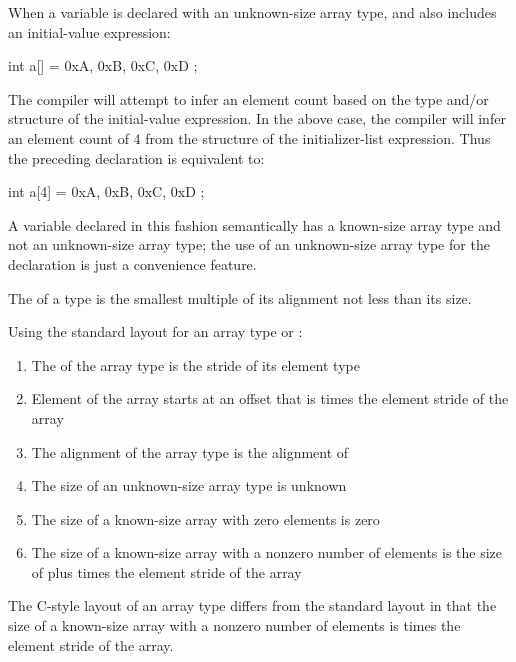 
When a variable is declared with an unknown-size array type, and also includes an initial-value expression:

\begin{codeblock}
int a[] = { 0xA, 0xB, 0xC, 0xD };
\end{codeblock}

The compiler will attempt to infer an element count based on the type and/or structure of the initial-value expression.
In the above case, the compiler will infer an element count of 4 from the structure of the initializer-list expression.
Thus the preceding declaration is equivalent to:

\begin{codeblock}
int a[4] = { 0xA, 0xB, 0xC, 0xD };
\end{codeblock}

A variable declared in this fashion semantically has a known-size array type and not an unknown-size array type; the use of an unknown-size array type for the declaration is just a convenience feature.


The  of a type is the smallest multiple of its alignment not less than its size.

Using the standard layout for an array type  or :

\begin{enumerate}
  \item{The  of the array type is the stride of its element type }
  \item{Element  of the array starts at an offset that is  times the element stride of the array}
  \item{The alignment of the array type is the alignment of }
  \item{The size of an unknown-size array type is unknown}
  \item{The size of a known-size array with zero elements is zero}
  \item{The size of a known-size array with a nonzero number  of elements is the size of  plus  times the element stride of the array}
\end{enumerate}


The C-style layout of an array type differs from the standard layout in that the size of a known-size array with a nonzero number  of elements is  times the element stride of the array.

